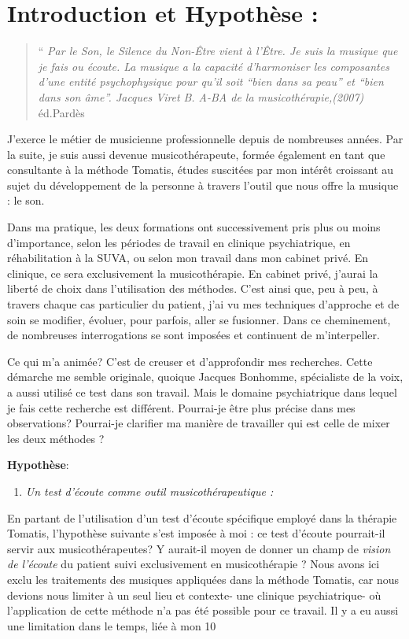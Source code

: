 \documentclass[12pt,french]{report}
\makeatletter
\let\SF@@footnote\footnote
\def\footnote{\ifx\protect\@typeset@protect
    \expandafter\SF@@footnote
  \else
    \expandafter\SF@gobble@opt
  \fi
}
\edef\SF@gobble@opt{\noexpand\protect
  \expandafter\noexpand\csname SF@gobble@opt \endcsname}
\makeatother
\begin{document}
\chapter{Introduction et Hypothèse : }
\begin{quotation}
``\emph{ Par le Son, le Silence du Non-Être vient à l'Être. Je suis
la musique que je fais ou écoute. La musique a la capacité d'harmoniser
les composantes d'une entité psychophysique pour qu'il soit ``bien
dans sa peau'' et ``bien dans son âme''. Jacques Viret }\footnote{\emph{B. A-BA de la musicothérapie,(2007)} éd.Pardès}
\end{quotation}
J'exerce le métier de musicienne professionnelle depuis de nombreuses
années. Par la suite, je suis aussi devenue musicothérapeute, formée
également en tant que consultante à la méthode Tomatis, études suscitées
par mon intérêt croissant au sujet du développement de la personne
à travers l'outil que nous offre la musique : le son.

Dans ma pratique, les deux formations ont successivement pris plus
ou moins d'importance, selon les périodes de travail en clinique psychiatrique,
en réhabilitation à la SUVA, ou selon mon travail dans mon cabinet
privé. En clinique, ce sera exclusivement la musicothérapie. En cabinet
privé, j'aurai la liberté de choix dans l'utilisation des méthodes.
C'est ainsi que, peu à peu, à travers chaque cas particulier du patient,
j'ai vu mes techniques d'approche et de soin se modifier, évoluer,
pour parfois, aller se fusionner. Dans ce cheminement, de nombreuses
interrogations se sont imposées et continuent de m'interpeller.

Ce qui m'a animée? C'est de creuser et d'approfondir mes recherches.
Cette démarche me semble originale, quoique Jacques Bonhomme, spécialiste de la voix, a aussi utilisé ce test dans son travail. Mais le domaine psychiatrique dans lequel je fais cette  recherche est différent.
 Pourrai-je être plus précise dans mes
observations? Pourrai-je clarifier ma manière de travailler qui est celle de mixer les deux méthodes ?

\textbf{Hypothèse}:\\ 
\begin{enumerate}
	\item \textit{Un test d'écoute comme outil musicothérapeutique :}
\end{enumerate}

En partant de l'utilisation d'un test d'écoute spécifique employé
dans la thérapie  Tomatis, l'hypothèse suivante s'est imposée à moi : ce test d'écoute
pourrait-il servir aux musicothérapeutes? Y aurait-il moyen de donner
un champ de \emph{vision de l'écoute }du patient suivi exclusivement
en musicothérapie ? Nous avons ici exclu les traitements des musiques appliquées dans la méthode Tomatis, car nous devions nous limiter à un seul lieu et contexte- une clinique psychiatrique- où l'application de cette méthode n'a pas été possible pour ce travail.  Il y a eu aussi une limitation dans le temps, liée à mon 10%
\end{document}
